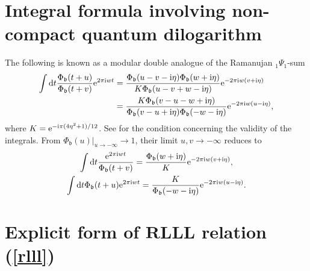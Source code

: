 \documentclass[pdftex]{sigma}
\newcommand{\bb}{{\mathfrak b}}
\newcommand{\e}{{\mathrm e}}
\numberwithin{equation}{section}
\begin{document}
\section{Integral formula involving non-compact quantum dilogarithm}\label{ap:nc}

The following is known as a modular double analogue of the Ramanujan ${}_1\Psi_1$-sum
\begin{align}%
\int {\rm d}t \frac{\Phi_\bb(t+u)}{\Phi_\bb(t+v)} \e^{2\pi {\rm i} wt}
&= \frac{\Phi_\bb(u-v-{\rm i}\eta)\Phi_\bb(w+{\rm i}\eta)}{K\Phi_\bb(u-v+w-{\rm i}\eta)}
\e^{-2\pi {\rm i} w(v+{\rm i}\eta)}
\nonumber\\
&= \frac{K\Phi_\bb(v-u-w+{\rm i}\eta)}{\Phi_\bb(v-u+{\rm i}\eta)\Phi_\bb(-w-{\rm i}\eta)}
\e^{-2\pi {\rm i} w(u-{\rm i}\eta)},
\label{rama2}
\end{align}
where $K = \e^{-{\rm i}\pi(4\eta^2+1)/12}$. See \cite[Section~6.3]{FKV01} for
the condition concerning the validity of the integrals. From
$\Phi_\bb(u)\vert_{u \rightarrow -\infty} \rightarrow 1$, their limit
$u, v \rightarrow -\infty$ reduces to
\begin{gather}
\int{\rm d}t \frac{\e^{2\pi {\rm i} w t}}{\Phi_\bb(t+v)} = \frac{\Phi_\bb(w+{\rm i}\eta)}{K}\e^{-2\pi {\rm i}w(v+{\rm i}\eta)},
\label{ram1}
\\
\int {\rm d}t \Phi_\bb(t+u)\e^{2\pi {\rm i} w t}
= \frac{K}{\Phi_\bb(-w-{\rm i}\eta)} \e^{-2\pi {\rm i} w(u-{\rm i}\eta)}.
\label{ram2}
\end{gather}

\section[Explicit form of RLLL relation (7.4)]{Explicit form of $\boldsymbol{RLLL}$ relation (\ref{rlll})}\label{app:rlll}
\end{document}
